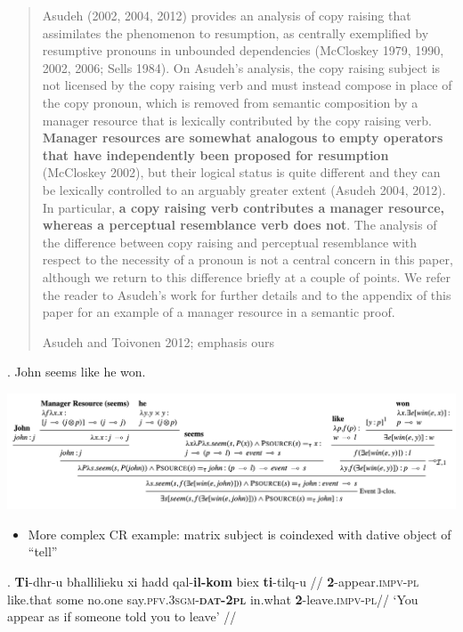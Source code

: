 \documentclass[11pt]{article}
\begin{document}
\blockquote[Asudeh and Toivonen 2012; emphasis ours]{
Asudeh (2002, 2004, 2012) provides an analysis of copy raising that assimilates the phenomenon to resumption, as centrally exemplified by resumptive pronouns in unbounded dependencies (McCloskey 1979, 1990, 2002, 2006; Sells 1984). 
On Asudeh’s analysis, the copy raising subject is not licensed by the copy raising verb and must instead compose in place of the copy pronoun, which is removed from semantic composition by a manager resource that is lexically contributed by the copy raising verb. 
\textbf{Manager resources are somewhat analogous to empty operators that have independently been proposed for resumption} (McCloskey 2002), but their logical status is quite different and they can be lexically controlled to an arguably greater extent (Asudeh 2004, 2012). 
In particular, \textbf{a copy raising verb contributes a manager resource, whereas a perceptual resemblance verb does not}. 
The analysis of the difference between copy raising and perceptual resemblance with respect to the necessity of a pronoun is not a central concern in this paper, although we return to this difference briefly at a couple of points. 
We refer the reader to Asudeh’s work for further details and to the appendix of this paper for an example of a manager resource in a semantic proof.
}
\ex. John seems like he won.

\includegraphics[scale=0.25]{SCR-20240317-bvtm.png}


\begin{itemize}
\item More complex CR example: matrix subject is coindexed with dative object of ``tell''
\end{itemize}

\ex. \begingl
  \gla \textbf{Ti}-dhr-u bħallilieku xi ħadd qal-\textbf{il-kom} biex \textbf{ti}-tilq-u //
  \glb \textbf{2}-appear.\textsc{impv-pl} like.that some no.one say.\textsc{pfv.3sgm-\textbf{dat-2pl}} in.what \textbf{2}-leave.\textsc{impv-pl}//
  \glft `You appear as if someone told you to leave' //
\endgl
\end{document}
